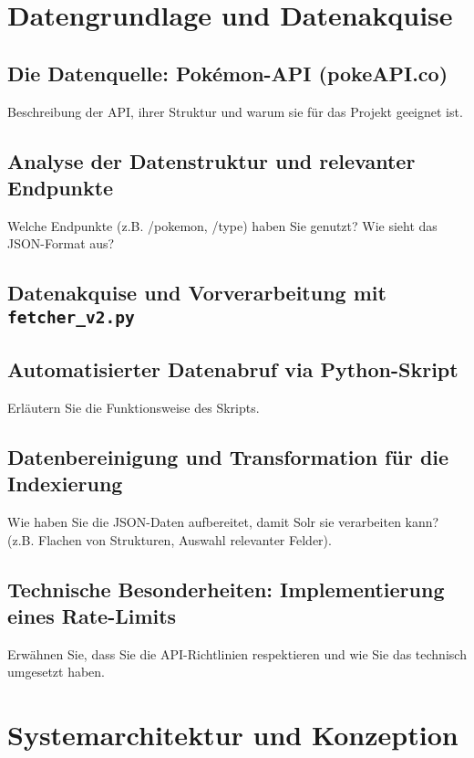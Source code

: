 \section{Datengrundlage und Datenakquise}
\label{chap:daten}

\subsection{Die Datenquelle: Pokémon-API (pokeAPI.co)}
\label{sec:datenquelle}
Beschreibung der API, ihrer Struktur und warum sie für das Projekt geeignet ist.

\subsection{Analyse der Datenstruktur und relevanter Endpunkte}
\label{sec:datenstruktur}
Welche Endpunkte (z.B. /pokemon, /type) haben Sie genutzt? Wie sieht das JSON-Format aus?

\subsection{Datenakquise und Vorverarbeitung mit \texttt{fetcher\_v2.py}}
\label{sec:datenakquise}

\subsection{Automatisierter Datenabruf via Python-Skript}
Erläutern Sie die Funktionsweise des Skripts.

\subsection{Datenbereinigung und Transformation für die Indexierung}
Wie haben Sie die JSON-Daten aufbereitet, damit Solr sie verarbeiten kann? (z.B. Flachen von Strukturen, Auswahl relevanter Felder).

\subsection{Technische Besonderheiten: Implementierung eines Rate-Limits}
Erwähnen Sie, dass Sie die API-Richtlinien respektieren und wie Sie das technisch umgesetzt haben.


\section{Systemarchitektur und Konzeption}
\label{chap:architektur}

